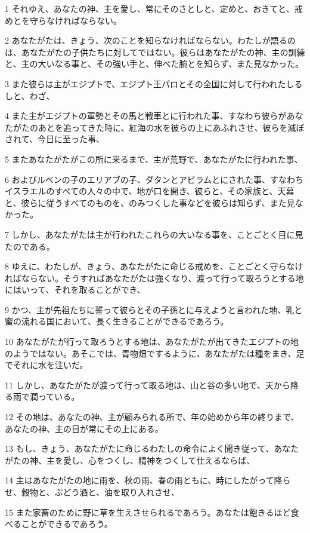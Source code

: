 \par 1 それゆえ、あなたの神、主を愛し、常にそのさとしと、定めと、おきてと、戒めとを守らなければならない。
\par 2 あなたがたは、きょう、次のことを知らなければならない。わたしが語るのは、あなたがたの子供たちに対してではない。彼らはあなたがたの神、主の訓練と、主の大いなる事と、その強い手と、伸べた腕とを知らず、また見なかった。
\par 3 また彼らは主がエジプトで、エジプト王パロとその全国に対して行われたしるしと、わざ、
\par 4 また主がエジプトの軍勢とその馬と戦車とに行われた事、すなわち彼らがあなたがたのあとを追ってきた時に、紅海の水を彼らの上にあふれさせ、彼らを滅ぼされて、今日に至った事、
\par 5 またあなたがたがこの所に来るまで、主が荒野で、あなたがたに行われた事、
\par 6 およびルベンの子のエリアブの子、ダタンとアビラムとにされた事、すなわちイスラエルのすべての人々の中で、地が口を開き、彼らと、その家族と、天幕と、彼らに従うすべてのものを、のみつくした事などを彼らは知らず、また見なかった。
\par 7 しかし、あなたがたは主が行われたこれらの大いなる事を、ことごとく目に見たのである。
\par 8 ゆえに、わたしが、きょう、あなたがたに命じる戒めを、ことごとく守らなければならない。そうすればあなたがたは強くなり、渡って行って取ろうとする地にはいって、それを取ることができ、
\par 9 かつ、主が先祖たちに誓って彼らとその子孫とに与えようと言われた地、乳と蜜の流れる国において、長く生きることができるであろう。
\par 10 あなたがたが行って取ろうとする地は、あなたがたが出てきたエジプトの地のようではない。あそこでは、青物畑でするように、あなたがたは種をまき、足でそれに水を注いだ。
\par 11 しかし、あなたがたが渡って行って取る地は、山と谷の多い地で、天から降る雨で潤っている。
\par 12 その地は、あなたの神、主が顧みられる所で、年の始めから年の終りまで、あなたの神、主の目が常にその上にある。
\par 13 もし、きょう、あなたがたに命じるわたしの命令によく聞き従って、あなたがたの神、主を愛し、心をつくし、精神をつくして仕えるならば、
\par 14 主はあなたがたの地に雨を、秋の雨、春の雨ともに、時にしたがって降らせ、穀物と、ぶどう酒と、油を取り入れさせ、
\par 15 また家畜のために野に草を生えさせられるであろう。あなたは飽きるほど食べることができるであろう。
